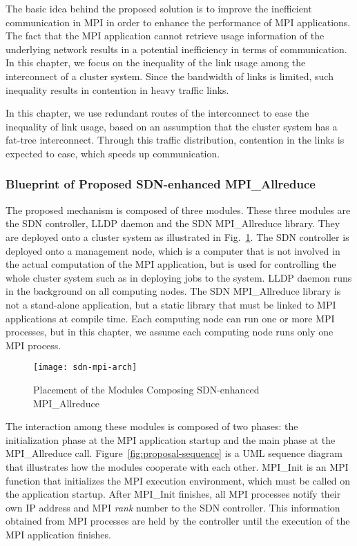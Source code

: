 The basic idea behind the proposed solution is to improve the
inefficient communication in MPI in order to enhance the performance of
MPI applications. The fact that the MPI application cannot retrieve
usage information of the underlying network results in a potential
inefficiency in terms of communication. In this chapter, we focus on the
inequality of the link usage among the interconnect of a cluster system. Since
the bandwidth of links is limited, such inequality results in contention in
heavy traffic links.

In this chapter, we use redundant routes of the interconnect to ease the
inequality of link usage, based on an assumption that the cluster system has a
fat-tree interconnect. Through this traffic distribution, contention in the
links is expected to ease, which speeds up communication.

\subsubsection{Blueprint of Proposed SDN-enhanced MPI\_Allreduce}

The proposed mechanism is composed of three modules. These three modules are
the SDN controller, LLDP daemon and the SDN MPI\_Allreduce library. They are
deployed onto a cluster system as illustrated in
Fig.~\ref{fig:proposal-placement}. The SDN controller is deployed onto a
management node, which is a computer that is not involved in the actual
computation of the MPI application, but is used for controlling the whole
cluster system such as in deploying jobs to the system. LLDP daemon runs in
the background on all computing nodes. The SDN MPI\_Allreduce library is not a
stand-alone application, but a static library that must be linked to MPI
applications at compile time. Each computing node can run one or more MPI
processes, but in this chapter, we assume each computing node runs only one MPI
process.

\begin{figure}
    \centering
    \texttt{[image: sdn-mpi-arch]}
    \caption{Placement of the Modules Composing SDN-enhanced MPI\_Allreduce}%
    \label{fig:proposal-placement}
\end{figure}

The interaction among these modules is composed of two phases: the
initialization phase at the MPI application startup and the main phase at the
MPI\_Allreduce call. Figure~\ref{fig:proposal-sequence} is a UML sequence
diagram that illustrates how the modules cooperate with each other. MPI\_Init
is an MPI function that initializes the MPI execution environment, which must
be called on the application startup. After MPI\_Init finishes, all MPI
processes notify their own IP address and MPI \emph{rank} number to the SDN
controller. This information obtained from MPI processes are held by the
controller until the execution of the MPI application finishes.

